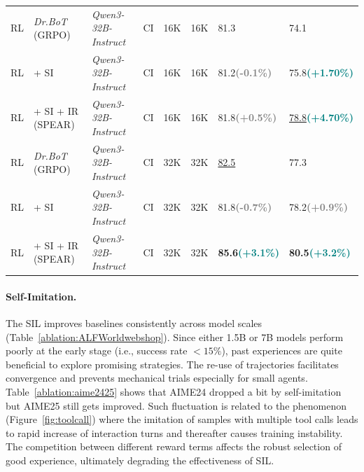 \documentclass[]{youtu} %
\newcommand{\method}{\textsc{SPEAR}\xspace}
\begin{document}
\begin{table}[htbp]
{{{\begin{tabular}{llllllll}
\midrule
\rowcolor[gray]{.95}
RL  & \textit{Dr.BoT} (GRPO) & \textit{Qwen3-32B-Instruct} & CI & 16K & 16K & 81.3 & 74.1 \\
RL & + SI & \textit{Qwen3-32B-Instruct} & CI & 16K & 16K & 81.2{\tiny \textbf{\textcolor{gray}{(-0.1\%)}}}  &  75.8{\tiny \textbf{\textcolor{teal}{(+1.70\%)}}} \\
\rowcolor{c2}
RL  & + SI + IR (\method) & \textit{Qwen3-32B-Instruct} & CI & 16K & 16K & 81.8{\tiny \textbf{\textcolor{gray}{(+0.5\%)}}}  &  \underline{78.8}{\tiny \textbf{\textcolor{teal}{(+4.70\%)}}} \\
\rowcolor[gray]{.95}
RL  & \textit{Dr.BoT} (GRPO) & \textit{Qwen3-32B-Instruct} & CI & 32K & 32K & \underline{82.5} & 77.3 \\
RL  & + SI & \textit{Qwen3-32B-Instruct} & CI & 32K & 32K & 81.8{\tiny \textbf{\textcolor{gray}{(-0.7\%)}}}  &  78.2{\tiny \textbf{\textcolor{gray}{(+0.9\%)}}} \\
\rowcolor{c2}
RL  & + SI + IR (\method) & \textit{Qwen3-32B-Instruct} & CI & 32K & 32K & \textbf{85.6}{\tiny \textbf{\textcolor{teal}{(+3.1\%)}}}  &  \textbf{80.5}{\tiny \textbf{\textcolor{teal}{(+3.2\%)}}}  \\
\bottomrule
\end{tabular}
}}}
\end{table}


\paragraph{Self-Imitation.}
The SIL improves baselines consistently across model scales (Table~\ref{ablation:ALFWorldwebshop}).
Since either 1.5B or 7B models perform poorly at the early stage (i.e., success rate $<15\%$),
past experiences are quite beneficial to explore promising strategies.
The re-use of trajectories facilitates convergence and prevents mechanical trials especially for small agents.
Table~\ref{ablation:aime2425} shows that AIME24 dropped a bit by self-imitation but AIME25 still gets improved.
Such fluctuation is related to the phenomenon (Figure~\ref{fig:toolcall}) where the imitation of samples with multiple tool calls leads to rapid increase of interaction turns and thereafter causes training instability.
The competition between different reward terms affects the robust selection of good experience, ultimately degrading the effectiveness of SIL.
\end{document}
